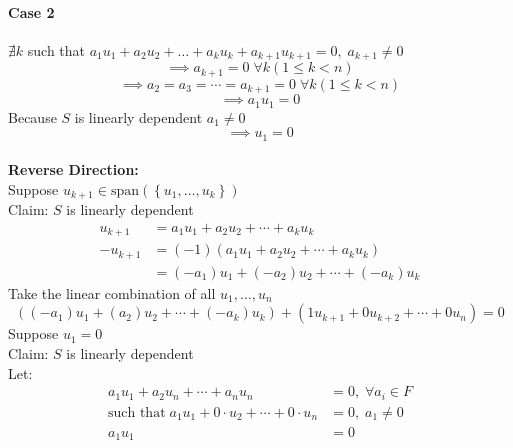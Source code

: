 \paragraph{Case 2} $\nexists k$ such that $a_1u_1 +a_2u_2
+\dots+a_ku_k+a_{k+1}u_{k+1}=0,\; a_{k+1}\neq 0$
\begin{equation}
\implies a_{k+1}=0 \; \forall k(1 \leq k< n) 
\end{equation}
\begin{equation}
\implies a_2=a_3=\cdots=a_{k+1}=0\;\forall k (1\leq k < n)
\end{equation}
\begin{equation}
\implies a_1u_1 = 0
\end{equation}
Because $S$ is linearly dependent $a_1\neq 0$ 
\begin{equation}
\implies  u_1 = 0
\end{equation}
\\
\textbf{Reverse Direction:}\\
Suppose $u_{k+1} \in \text{span}(\left\{u_1,\dots,u_k\right\})$
\\Claim: $S$ is linearly dependent 
\begin{align}
u_{k+1}  &= a_1u_1 + a_2u_2 + \cdots + a_ku_k\\
-u_{k+1} &= \left(-1\right)\left(a_1u_1 + a_2u_2 + \cdots +
  a_ku_k\right)\\
&= \left(-a_1\right)u_1 + \left(-a_2\right)u_2 + \cdots + \left(-a_k\right)u_k
\end{align}
Take the linear combination of all $u_1,\dots,u_n$
\begin{equation}
\left(\left(-a_1\right)u_1 + \left(a_2\right)u_2 + \cdots +
  \left(-a_k\right)u_k\right) + \left(1u_{k+1} + 0u_{k+2}
  + \cdots + 0u_n\right)=0
\end{equation}
Suppose $u_1 = 0$
\\Claim: $S$ is linearly dependent
\\Let:
\begin{align}
a_1u_1 +a_2u_n +\cdots+a_nu_n &= 0,\; \forall a_i \in F\\
\text{such that}\;a_1u_1 + 0\cdot u_2 +\cdots+0\cdot u_n &= 0,\;
a_1\neq 0\\
a_1u_1 &= 0
\end{align}
